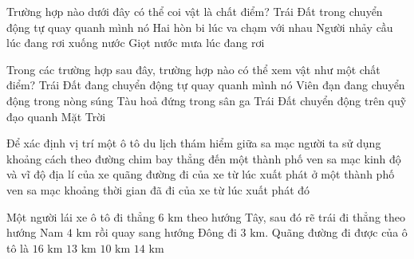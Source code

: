 \begin{ex} Trường hợp nào dưới đây có thể coi vật là chất điểm?
\choice
{Trái Đất trong chuyển động tự quay quanh mình nó}
{Hai hòn bi lúc va chạm với nhau}
{Người nhảy cầu lúc đang rơi xuống nước}
{\True Giọt nước mưa lúc đang rơi}
\end{ex}

\begin{ex} Trong các trường hợp sau đây, trường hợp nào có thể xem vật như một chất điểm?
\choice
{Trái Đất đang chuyển động tự quay quanh mình nó}
{Viên đạn đang chuyển động trong nòng súng}
{Tàu hoả đứng trong sân ga}
{\True Trái Đất chuyển động trên quỹ đạo quanh Mặt Trời}
\end{ex}

\begin{ex} Để xác định vị trí một ô tô du lịch thám hiểm giữa sa mạc người ta sử dụng
\choice
{khoảng cách theo đường chim bay thẳng đến một thành phố ven sa mạc}
{\True kinh độ và vĩ độ địa lí của xe}
{quãng đường đi của xe từ lúc xuất phát ở một thành phố ven sa mạc}
{khoảng thời gian đã đi của xe từ lúc xuất phát đó}
\end{ex}

\begin{ex} Một người lái xe ô tô đi thẳng $6\text{ km}$ theo hướng Tây, sau đó rẽ trái đi thẳng theo hướng Nam $4\text{ km}$ rồi quay sang hướng Đông đi $3\text{ km}$. Quãng đường đi được của ô tô là
\choice
{$16\text{ km}$}
{\True $13\text{ km}$}
{$10\text{ km}$}
{$14\text{ km}$}
\end{ex}


